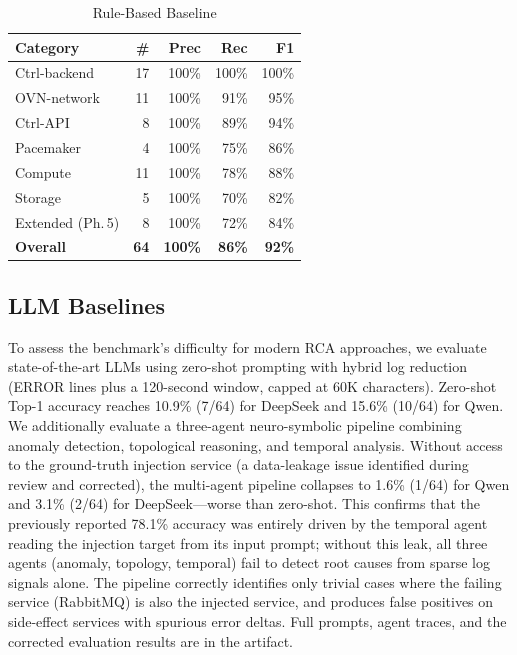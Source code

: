 \documentclass[sigconf,review]{acmart}
\begin{document}
\begin{table}[t]
\centering
\footnotesize
\caption{Rule-Based Baseline}
\label{tab:baseline}
\begin{tabular}{@{}lrrrr@{}}
\toprule
\textbf{Category} & \textbf{\#} & \textbf{Prec} & \textbf{Rec} & \textbf{F1} \\
\midrule
Ctrl-backend & 17 & 100\% & 100\% & 100\% \\
OVN-network & 11 & 100\% &  91\% &  95\% \\
Ctrl-API      &  8 & 100\% &  89\% &  94\% \\
Pacemaker     &  4 & 100\% &  75\% &  86\% \\
Compute       & 11 & 100\% &  78\% &  88\% \\
Storage       &  5 & 100\% &  70\% &  82\% \\
Extended (Ph.\,5) & 8 & 100\% & 72\% & 84\% \\
\midrule
\textbf{Overall} & \textbf{64} & \textbf{100\%} & \textbf{86\%} & \textbf{92\%} \\
\bottomrule
\end{tabular}
\end{table}

\subsection{LLM Baselines}
\label{sec:llm}

To assess the benchmark's difficulty for modern RCA approaches, we evaluate state-of-the-art LLMs using zero-shot prompting with hybrid log reduction (ERROR lines plus a 120-second window, capped at 60K characters). Zero-shot Top-1 accuracy reaches 10.9\% (7/64) for DeepSeek and 15.6\% (10/64) for Qwen. We additionally evaluate a three-agent neuro-symbolic pipeline combining anomaly detection, topological reasoning, and temporal analysis. Without access to the ground-truth injection service (a data-leakage issue identified during review and corrected), the multi-agent pipeline collapses to 1.6\% (1/64) for Qwen and 3.1\% (2/64) for DeepSeek---worse than zero-shot. This confirms that the previously reported 78.1\% accuracy was entirely driven by the temporal agent reading the injection target from its input prompt; without this leak, all three agents (anomaly, topology, temporal) fail to detect root causes from sparse log signals alone. The pipeline correctly identifies only trivial cases where the failing service (RabbitMQ) is also the injected service, and produces false positives on side-effect services with spurious error deltas. Full prompts, agent traces, and the corrected evaluation results are in the artifact.
\end{document}
